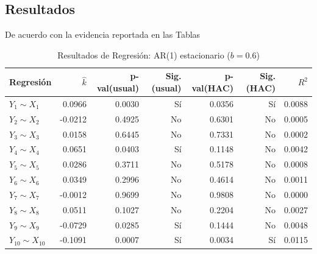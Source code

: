 \documentclass[11pt,a4paper]{article}
\begin{document}
	\subsection{Resultados}
	De acuerdo con la evidencia reportada en las Tablas
\begin{table}[H]
	\centering
	\caption{Resultados de Regresión: AR(1) estacionario ($b = 0.6$)}
	\label{tab:res_i}
	\begin{tabular}{lrrrrrr}
		\toprule
		Regresión & $\hat{k}$ & p-val(usual) & Sig. (usual) & p-val(HAC) & Sig. (HAC) & $R^2$ \\
		\midrule
		$Y_1 \sim X_1$   & 0.0966  & 0.0030 & Sí  & 0.0356 & Sí  & 0.0088 \\
		$Y_2 \sim X_2$   & -0.0212 & 0.4925 & No  & 0.6301 & No  & 0.0005 \\
		$Y_3 \sim X_3$   & 0.0158  & 0.6445 & No  & 0.7331 & No  & 0.0002 \\
		$Y_4 \sim X_4$   & 0.0651  & 0.0403 & Sí  & 0.1148 & No  & 0.0042 \\
		$Y_5 \sim X_5$   & 0.0286  & 0.3711 & No  & 0.5178 & No  & 0.0008 \\
		$Y_6 \sim X_6$   & 0.0349  & 0.2996 & No  & 0.4614 & No  & 0.0011 \\
		$Y_7 \sim X_7$   & -0.0012 & 0.9699 & No  & 0.9808 & No  & 0.0000 \\
		$Y_8 \sim X_8$   & 0.0511  & 0.1027 & No  & 0.2204 & No  & 0.0027 \\
		$Y_9 \sim X_9$   & -0.0729 & 0.0285 & Sí  & 0.1444 & No  & 0.0048 \\
		$Y_{10} \sim X_{10}$ & -0.1091 & 0.0007 & Sí  & 0.0034 & Sí  & 0.0115 \\
		\bottomrule
	\end{tabular}
\end{table}
\end{document}
